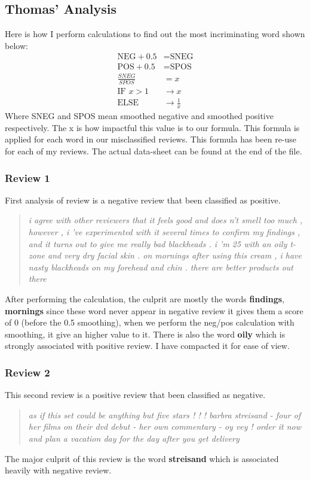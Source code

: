 \documentclass[runningheads]{llncs}
\begin{document}
    \subsection{Thomas' Analysis}
    Here is how I perform calculations to find out the most incriminating word shown below:
    $$
    \begin{aligned}
        \text{NEG} + 0.5 &= \text{SNEG}\\
        \text{POS} + 0.5 &= \text{SPOS}\\
        \frac{SNEG}{SPOS} &= x\\
        \text{IF } x > 1 &\rightarrow x\\
        \text{ELSE } &\rightarrow \frac{1}{x}
    \end{aligned}
    $$
    Where SNEG and SPOS mean smoothed negative and smoothed positive respectively. The x is how impactful this value is to our formula. This formula is applied for each word in our misclassified reviews. This formula has been re-use for each of my reviews. The actual data-sheet can be found at the end of the file.
    \subsubsection{Review 1}
    First analysis of review is a negative review that been classified as positive.
    \begin{quotation}
        \textit{i agree with other reviewers that it feels good and does n't smell too much , however , i 've experimented with it several times to confirm my findings , and it turns out to give me really bad blackheads . i 'm 25 with an oily t-zone and very dry facial skin . on mornings after using this cream , i have nasty blackheads on my forehead and chin . there are better products out there} 
    \end{quotation}
    After performing the calculation, the culprit are mostly the words \textbf{findings}, \textbf{mornings} since these word never appear in negative review it gives them a score of 0 (before the 0.5 smoothing), when we perform the neg/pos calculation with smoothing, it give an higher value to it. There is also the word \textbf{oily} which is strongly associated with positive review. I have compacted it for ease of view.
    \subsubsection{Review 2}
    This second review is a positive review that been classified as negative.
    \begin{quotation}
        \textit{as if this set could be anything but five stars ! ! ! barbra streisand - four of her films on their dvd debut - her own commentary - oy vey ! order it now and plan a vacation day for the day after you get delivery }
    \end{quotation}
    The major culprit of this review is the word \textbf{streisand} which is associated heavily with negative review. 
\end{document}
